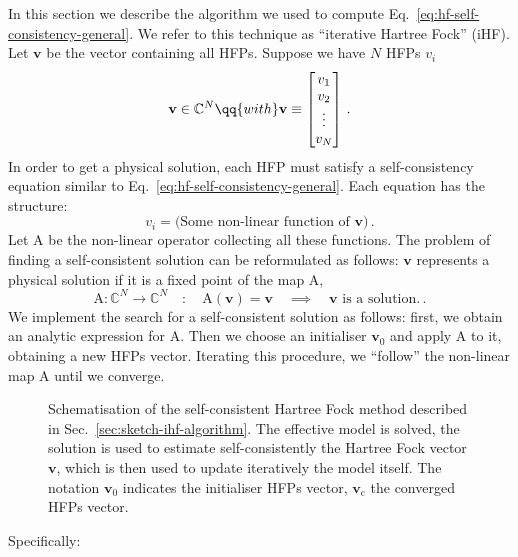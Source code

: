 In this section we describe the algorithm we used to compute Eq.~\eqref{eq:hf-self-consistency-general}. We refer to this technique as ``iterative Hartree Fock'' (iHF). Let $\mathbf{v}$ be the vector containing all HFPs. Suppose we have $N$ HFPs $v_i$
\[
	\mathbf{v} \in \mathbb{C}^N
	\qq{with}
	\mathbf{v} \equiv \begin{bmatrix}
		v_1 \\ v_2 \\ \vdots \\ v_N
	\end{bmatrix} \, .
\]
In order to get a physical solution, each HFP must satisfy a self-consistency equation similar to Eq.~\eqref{eq:hf-self-consistency-general}. Each equation has the structure:
\[
	v_i = \text{(Some non-linear function of $\mathbf{v}$)} \, .
\]
Let $\mathrm{A}$ be the non-linear operator collecting all these functions. The problem of finding a self-consistent solution can be reformulated as follows: $\mathbf{v}$ represents a physical solution if it is a fixed point of the map $\mathrm{A}$,
\begin{equation}\label{eq:hf-A-fixed-point}
	\mathrm{A} \colon \mathbb{C}^N \to \mathbb{C}^N
	\quad\colon\quad
	\mathrm{A} (\mathbf{v}) = \mathbf{v}
	\quad\implies\quad
	\text{$\mathbf{v}$ is a solution.} \, .
\end{equation}
We implement the search for a self-consistent solution as follows: first, we obtain an analytic expression for $\mathrm{A}$. Then we choose an initialiser $\mathbf{v}_0$ and apply $\mathrm{A}$ to it, obtaining a new HFPs vector. Iterating this procedure, we ``follow'' the non-linear map $\mathrm{A}$ until we converge.
%
\begin{figure}
	\centering
	
	\caption{Schematisation of the self-consistent Hartree Fock method described in Sec.~\ref{sec:sketch-ihf-algorithm}. The effective model is solved, the solution is used to estimate self-consistently the Hartree Fock vector $\mathbf{v}$, which is then used to update iteratively the model itself. The notation $\mathbf{v}_0$ indicates the initialiser HFPs vector, $\mathbf{v}_\mathrm{c}$ the converged HFPs vector.}
	\label{fig:effective-model-scheme}
\end{figure}
%
Specifically:
